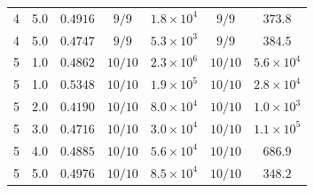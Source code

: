 \begin{tabular}{cc c cc cc}
        4 & 5.0 & $0.4916$ & $9/9$ & $1.8 \times 10^{4}$ & $9/9$ & $373.8$ \\
        4 & 5.0 & $0.4747$ & $9/9$ & $5.3 \times 10^{3}$ & $9/9$ & $384.5$ \\
        5 & 1.0 & $0.4862$ & $10/10$ & $2.3 \times 10^{6}$ & $10/10$ & $5.6 \times 10^{4}$ \\
        5 & 1.0 & $0.5348$ & $10/10$ & $1.9 \times 10^{5}$ & $10/10$ & $2.8 \times 10^{4}$ \\
        5 & 2.0 & $0.4190$ & $10/10$ & $8.0 \times 10^{4}$ & $10/10$ & $1.0 \times 10^{3}$ \\
        5 & 3.0 & $0.4716$ & $10/10$ & $3.0 \times 10^{4}$ & $10/10$ & $1.1 \times 10^{5}$ \\
        5 & 4.0 & $0.4885$ & $10/10$ & $5.6 \times 10^{4}$ & $10/10$ & $686.9$ \\
        5 & 5.0 & $0.4976$ & $10/10$ & $8.5 \times 10^{4}$ & $10/10$ & $348.2$ \\
        \bottomrule
    \end{tabular}
